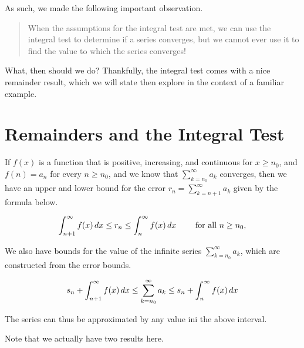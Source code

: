 \documentclass{ximera}
\begin{document}
As such, we made the following important observation. 
  
\begin{quote}
When the assumptions for the integral test are met, we can use the integral test to determine if a series converges, but we cannot ever use it to find the value to which the series converges!
\end{quote}

What, then should we do?  Thankfully, the integral test comes with a nice remainder result, which we will state then explore in the context of a familiar example.



\section{Remainders and the Integral Test}

\begin{theorem}
If $f(x)$ is a function that is positive, increasing, and continuous for $x \geq n_0$,  and $f(n) = a_n$ for every $n \geq n_0$, and we know that $\sum_{k=n_0}^\infty a_k$ converges, then we have an upper and lower bound for the error $r_n=\sum_{k=n+1}^{\infty} a_k$ given by the formula below.

\[
\int_{n+1}^{\infty} f(x) \mathop{}\!d x \leq  r_n \leq \int_{n}^{\infty} f(x) \mathop{}\!d x \qquad \textrm{ for all } n \geq n_0,
\]

We also have bounds for the value of the infinite series $\sum_{k=n_0}^\infty a_k$, which are constructed from the error bounds.

\[
s_n+ \int_{n+1}^{\infty} f(x) \mathop{}\!d x \leq  \sum_{k=n_0}^\infty a_k \leq s_n+ \int_{n}^{\infty} f(x) \mathop{}\!d x 
\]

The series can thus be approximated by any value ini the above interval.
\end{theorem}

Note that we actually have two results here.
\end{document}
